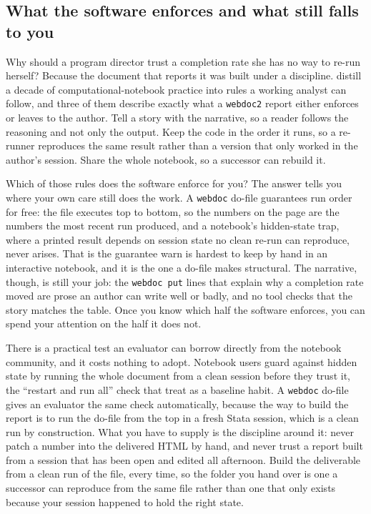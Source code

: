 \subsection{What the software enforces and what still falls to you}
Why should a program director trust a completion rate she has no way to re-run herself? Because the document that reports it was built under a discipline. \textcite{rule2019ten} distill a decade of computational-notebook practice into rules a working analyst can follow, and three of them describe exactly what a \texttt{webdoc2} report either enforces or leaves to the author. Tell a story with the narrative, so a reader follows the reasoning and not only the output. Keep the code in the order it runs, so a re-runner reproduces the same result rather than a version that only worked in the author's session. Share the whole notebook, so a successor can rebuild it.

Which of those rules does the software enforce for you? The answer tells you where your own care still does the work. A \texttt{webdoc} do-file guarantees run order for free: the file executes top to bottom, so the numbers on the page are the numbers the most recent run produced, and a notebook's hidden-state trap, where a printed result depends on session state no clean re-run can reproduce, never arises. That is the guarantee \textcite{rule2019ten} warn is hardest to keep by hand in an interactive notebook, and it is the one a do-file makes structural. The narrative, though, is still your job: the \texttt{webdoc put} lines that explain why a completion rate moved are prose an author can write well or badly, and no tool checks that the story matches the table. Once you know which half the software enforces, you can spend your attention on the half it does not.

There is a practical test an evaluator can borrow directly from the notebook community, and it costs nothing to adopt. Notebook users guard against hidden state by running the whole document from a clean session before they trust it, the \enquote{restart and run all} check that \textcite{rule2019ten} treat as a baseline habit. A \texttt{webdoc} do-file gives an evaluator the same check automatically, because the way to build the report is to run the do-file from the top in a fresh Stata session, which is a clean run by construction. What you have to supply is the discipline around it: never patch a number into the delivered HTML by hand, and never trust a report built from a session that has been open and edited all afternoon. Build the deliverable from a clean run of the file, every time, so the folder you hand over is one a successor can reproduce from the same file rather than one that only exists because your session happened to hold the right state.

